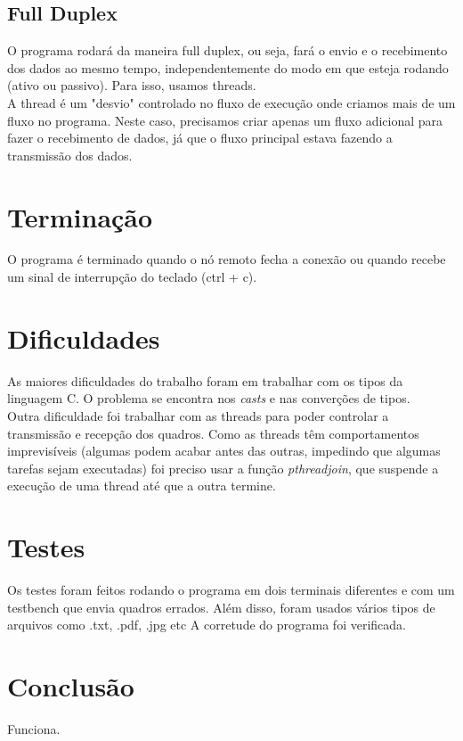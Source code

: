 \documentclass[10pt]{article}
\begin{document}
		\subsection{Full Duplex}
			O programa rodará da maneira full duplex, ou seja, fará o envio e o recebimento dos dados ao mesmo tempo, independentemente do modo em que esteja rodando (ativo ou passivo). Para isso, usamos threads. 
			\\ A thread é um "desvio" controlado no fluxo de execução onde criamos mais de um fluxo no programa. Neste caso, precisamos criar apenas um fluxo adicional para fazer o recebimento de dados, já que o fluxo principal estava fazendo a transmissão dos dados.
	\section{Terminação}
		O programa é terminado quando o nó remoto fecha a conexão ou quando recebe um sinal de interrupção do teclado (ctrl + c).
	\section{Dificuldades}
		As maiores dificuldades do trabalho foram em trabalhar com os tipos da linguagem C. O problema se encontra nos \textit{casts} e nas converções de tipos.
		\\Outra dificuldade foi trabalhar com as threads para poder controlar a transmissão e recepção dos quadros. Como as threads têm comportamentos imprevisíveis (algumas podem acabar antes das outras, impedindo que algumas tarefas sejam executadas) foi preciso usar a função \textit{pthreadjoin}, que suspende a execução de uma thread até que a outra termine.
	\section{Testes}
		Os testes foram feitos rodando o programa em dois terminais diferentes e com um testbench que envia quadros errados. Além disso, foram usados vários tipos de arquivos como .txt, .pdf, .jpg etc
		A corretude do programa foi verificada.
	\section{Conclusão} 
		Funciona.
\end{document}
